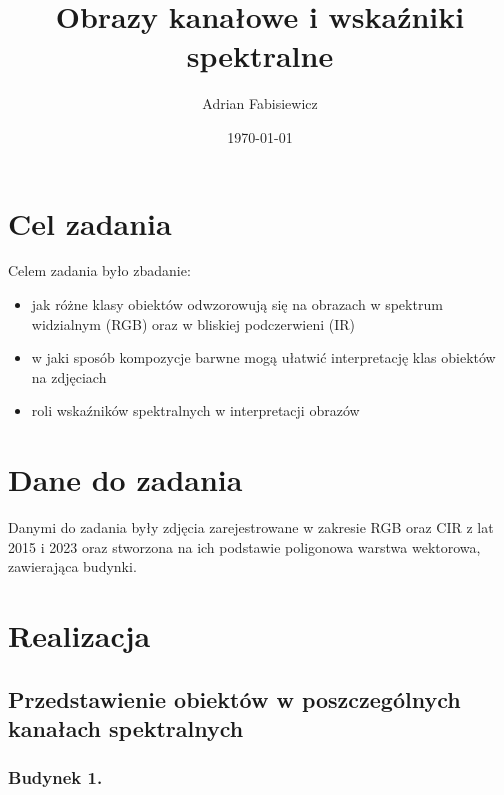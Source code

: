 \documentclass[a4paper,12pt]{article}  %
\title{Obrazy kanałowe i wskaźniki spektralne}
\author{Adrian Fabisiewicz}
\date{\today}
\begin{document}
\maketitle  %

\section{Cel zadania}
Celem zadania było zbadanie:
\begin{itemize}
    \item jak różne klasy obiektów odwzorowują się na obrazach w spektrum widzialnym (RGB) oraz w bliskiej podczerwieni (IR) 
    \item w jaki sposób kompozycje barwne mogą ułatwić interpretację klas obiektów na zdjęciach
    \item roli wskaźników spektralnych w interpretacji obrazów
\end{itemize}

\section{Dane do zadania}
Danymi do zadania były zdjęcia zarejestrowane w zakresie RGB oraz CIR z lat 2015 i 2023 oraz stworzona na ich podstawie poligonowa warstwa wektorowa, zawierająca budynki.

\newpage
\section{Realizacja}
\subsection{Przedstawienie obiektów w poszczególnych kanałach spektralnych}

\subsubsection{Budynek 1.}
\end{document}
